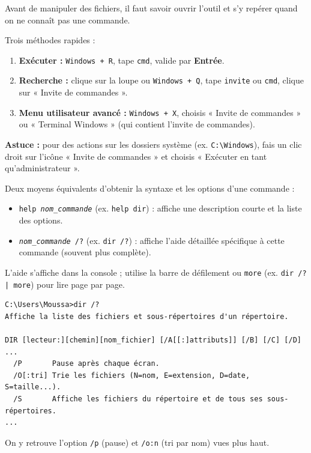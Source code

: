 \documentclass[11pt]{article}
\begin{document}
Avant de manipuler des fichiers, il faut savoir ouvrir l'outil et s'y repérer quand on ne connaît pas une commande.

\begin{methode}
Trois méthodes rapides :
\begin{enumerate}
\item \textbf{Exécuter :} \texttt{Windows + R}, tape \texttt{cmd}, valide par \textbf{Entrée}.
\item \textbf{Recherche :} clique sur la loupe ou \texttt{Windows + Q}, tape \texttt{invite} ou \texttt{cmd}, clique sur « Invite de commandes ».
\item \textbf{Menu utilisateur avancé :} \texttt{Windows + X}, choisis « Invite de commandes » ou « Terminal Windows » (qui contient l'invite de commandes).
\end{enumerate}
\textbf{Astuce :} pour des actions sur les dossiers système (ex. \texttt{C:\textbackslash Windows}), fais un clic droit sur l'icône « Invite de commandes » et choisis « Exécuter en tant qu'administrateur ».
\end{methode}

\begin{propriete}
Deux moyens équivalents d'obtenir la syntaxe et les options d'une commande :
\begin{itemize}
\item \texttt{help \textit{nom\_commande}} (ex. \texttt{help dir}) : affiche une description courte et la liste des options.
\item \texttt{\textit{nom\_commande} /?} (ex. \texttt{dir /?}) : affiche l'aide détaillée spécifique à cette commande (souvent plus complète).
\end{itemize}
L'aide s'affiche dans la console ; utilise la barre de défilement ou \texttt{more} (ex. \texttt{dir /? | more}) pour lire page par page.
\end{propriete}

\begin{exemplebox}
\begin{lstlisting}
C:\Users\Moussa>dir /?
Affiche la liste des fichiers et sous-répertoires d'un répertoire.

DIR [lecteur:][chemin][nom_fichier] [/A[[:]attributs]] [/B] [/C] [/D] ...
  /P       Pause après chaque écran.
  /O[:tri] Trie les fichiers (N=nom, E=extension, D=date, S=taille...).
  /S       Affiche les fichiers du répertoire et de tous ses sous-répertoires.
...
\end{lstlisting}
On y retrouve l'option \texttt{/p} (pause) et \texttt{/o:n} (tri par nom) vues plus haut.
\end{exemplebox}
\end{document}
